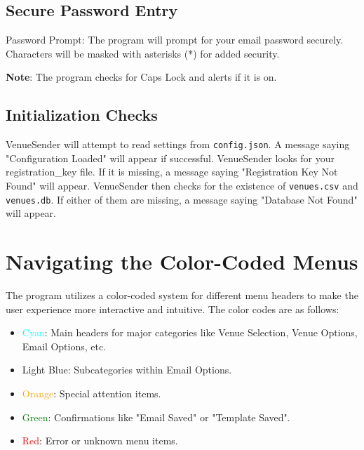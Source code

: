 \documentclass{article}
\begin{document}
	\subsection{Secure Password Entry}
	
	Password Prompt: The program will prompt for your email password securely. Characters will be masked with asterisks (*) for added security.

	\textbf{Note}: The program checks for Caps Lock and alerts if it is on.

	\subsection{Initialization Checks}
	
	VenueSender will attempt to read settings from \texttt{config.json}. A message saying "Configuration Loaded" will appear if successful.
	\newline
	\newline
	VenueSender looks for your registration\_key file. If it is missing, a message saying "Registration Key Not Found" will appear.
	\newline
	\newline
	VenueSender then checks for the existence of \texttt{venues.csv} and \texttt{venues.db}. If either of them are missing, a message saying "Database Not Found" will appear.
		
	\section{Navigating the Color-Coded Menus}
	
	The program utilizes a color-coded system for different menu headers to make the user experience more interactive and intuitive. The color codes are as follows:
	
	\begin{itemize}
		\item \textcolor{cyan}{Cyan}: Main headers for major categories like Venue Selection, Venue Options, Email Options, etc.
		\item \textcolor{blue!30}{Light Blue}: Subcategories within Email Options.
		\item \textcolor{orange}{Orange}: Special attention items.
		\item \textcolor{green}{Green}: Confirmations like "Email Saved" or "Template Saved".
		\item \textcolor{red}{Red}: Error or unknown menu items.
	\end{itemize}
	
\end{document}
